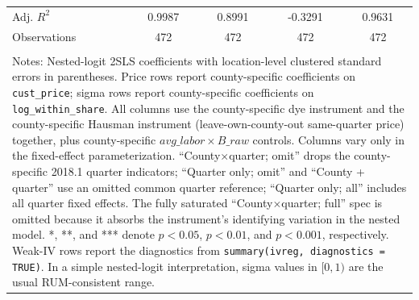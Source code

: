 \begin{table}[!htbp]
\begin{tabular}{lcccc}
Adj. $R^2$ & 0.9987 & 0.8991 & -0.3291 & 0.9631 \\
Observations & 472 & 472 & 472 & 472 \\
\hline \\[-1.8ex]
\multicolumn{5}{p{0.92\linewidth}}{\footnotesize Notes: Nested-logit 2SLS coefficients with location-level clustered standard errors in parentheses. Price rows report county-specific coefficients on \texttt{cust\_price}; sigma rows report county-specific coefficients on \texttt{log\_within\_share}. All columns use the county-specific dye instrument and the county-specific Hausman instrument (leave-own-county-out same-quarter price) together, plus county-specific $avg\_labor \times B\_raw$ controls. Columns vary only in the fixed-effect parameterization. ``County$\times$quarter; omit'' drops the county-specific 2018.1 quarter indicators; ``Quarter only; omit'' and ``County + quarter'' use an omitted common quarter reference; ``Quarter only; all'' includes all quarter fixed effects. The fully saturated ``County$\times$quarter; full'' spec is omitted because it absorbs the instrument's identifying variation in the nested model. *, **, and *** denote $p<0.05$, $p<0.01$, and $p<0.001$, respectively. Weak-IV rows report the diagnostics from \texttt{summary(ivreg, diagnostics = TRUE)}. In a simple nested-logit interpretation, sigma values in $[0,1)$ are the usual RUM-consistent range.}\\
\end{tabular}
\end{table}
